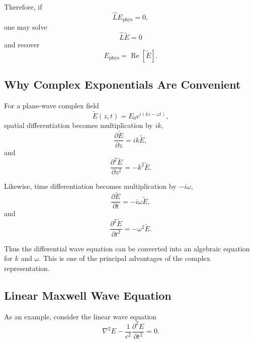 \documentclass[11pt]{article}
\begin{document}
Therefore, if
\begin{equation}
\hat{L}E_{\mathrm{phys}}=0,
\end{equation}
one may solve
\begin{equation}
\hat{L}\tilde{E}=0
\end{equation}
and recover
\begin{equation}
\boxed{
E_{\mathrm{phys}}
=
\operatorname{Re}\!\left[\tilde{E}\right]
}.
\end{equation}

\subsection{Why Complex Exponentials Are Convenient}

For a plane-wave complex field
\begin{equation}
\tilde{E}(z,t)
=
E_0e^{i(kz-\omega t)},
\end{equation}
spatial differentiation becomes multiplication by \(ik\),
\begin{equation}
\frac{\partial\tilde{E}}{\partial z}
=
ik\tilde{E},
\end{equation}
and
\begin{equation}
\frac{\partial^2\tilde{E}}{\partial z^2}
=
-k^2\tilde{E}.
\end{equation}

Likewise, time differentiation becomes multiplication by \(-i\omega\),
\begin{equation}
\frac{\partial\tilde{E}}{\partial t}
=
-i\omega\tilde{E},
\end{equation}
and
\begin{equation}
\frac{\partial^2\tilde{E}}{\partial t^2}
=
-\omega^2\tilde{E}.
\end{equation}

Thus the differential wave equation can be converted into an algebraic equation for \(k\) and \(\omega\).  This is one of the principal advantages of the complex representation.

\subsection{Linear Maxwell Wave Equation}

As an example, consider the linear wave equation
\begin{equation}
\nabla^2E
-
\frac{1}{c^2}
\frac{\partial^2E}{\partial t^2}
=
0.
\end{equation}
\end{document}
